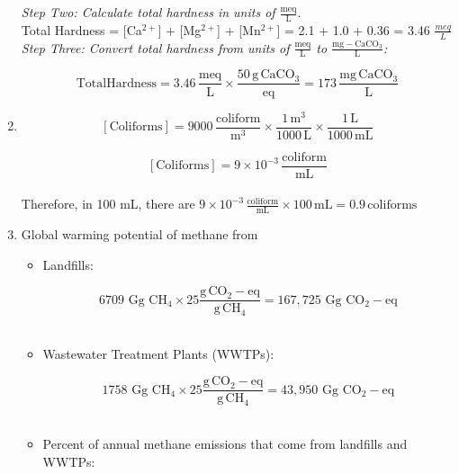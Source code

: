 \documentclass[12pt,letterpaper]{article}
\newcommand{\var}[1]{{\operatorname{#1}}}
\begin{document}
\begin{enumerate}
\emph{Step Two:
Calculate total hardness in units of $\mathrm{\frac{meq}{L}}$.}\\

Total Hardness = [Ca$^{2+}$] + [Mg$^{2+}$] + [Mn$^{2+}$] = 2.1 + 1.0 + 0.36 = 3.46 $\frac{meq}{L}$\\

\emph{Step Three: Convert total hardness from units of $\mathrm{\frac{meq}{L}}$ to $\mathrm{\frac{mg-CaCO_3}{L}}$:}

\begin{equation*}
\mathrm{Total Hardness = 3.46\, \frac{meq}{L}\times\frac{50\, g\, CaCO_3}{eq} = 173\, \frac{mg\, CaCO_3}{L}}
\end{equation*}

\item 

\begin{equation*}
\mathrm{[Coliforms] = 9000\, \frac{coliform}{m^3}\times\frac{1\, m^3}{1000\, L}\times\frac{1 \,L}{1000\, mL}}
\end{equation*} 

\begin{equation*}
\mathrm{[Coliforms]= 9\times 10^{-3}\, \frac{coliform}{mL}}
\end{equation*}\\

Therefore, in 100 mL, there are $\mathrm{9\times 10^{-3}\, \frac{coliform}{mL}\times 100\, mL = 0.9\, coliforms}$

\item 
Global warming potential of methane from

\begin{itemize}
\item Landfills:

\begin{equation*}
\mathrm{6709\, \, Gg\, \, CH_4\times 25\frac{g\, \var{CO_2-eq}}{g\, CH_4}= 167,725\,\, Gg\, \, \var{CO_2-eq}}
\end{equation*}\\

\item Wastewater Treatment Plants (WWTPs):

\begin{equation*}
\mathrm{1758\, \, Gg\, \, CH_4\times 25\frac{g\, \var{CO_2-eq}}{g\, CH_4}= 43,950\, \, Gg\, \, \var{CO_2-eq}}
\end{equation*}\\

\item Percent of annual methane emissions that come from landfills and WWTPs:


\end{itemize}
\end{enumerate}
\end{document}

